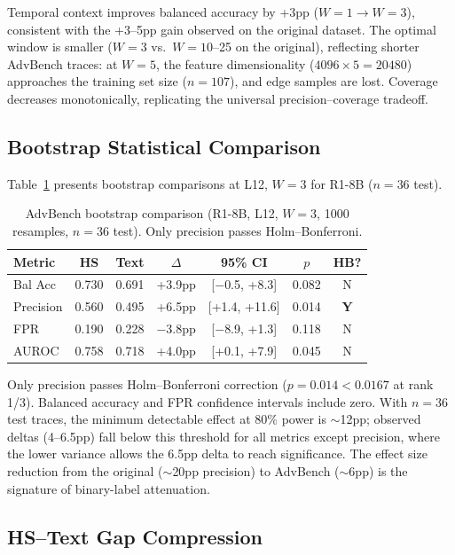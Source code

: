 \documentclass[11pt]{article}
\begin{document}
Temporal context improves balanced accuracy by +3pp ($W{=}1 \to W{=}3$), consistent with the +3--5pp gain observed on the original dataset. The optimal window is smaller ($W{=}3$ vs.\ $W{=}10$--25 on the original), reflecting shorter AdvBench traces: at $W{=}5$, the feature dimensionality ($4096 \times 5 = 20480$) approaches the training set size ($n{=}107$), and edge samples are lost. Coverage decreases monotonically, replicating the universal precision--coverage tradeoff.

\subsection{Bootstrap Statistical Comparison}
\label{sec:bootstrap}

Table~\ref{tab:bootstrap} presents bootstrap comparisons at L12, $W{=}3$ for R1-8B ($n{=}36$ test).

\begin{table}[t]
\centering
\small
\caption{AdvBench bootstrap comparison (R1-8B, L12, $W{=}3$, 1000 resamples, $n{=}36$ test). Only precision passes Holm--Bonferroni.}
\label{tab:bootstrap}
\begin{tabular}{lcccccc}
\toprule
Metric & HS & Text & $\Delta$ & 95\% CI & $p$ & HB? \\
\midrule
Bal Acc & 0.730 & 0.691 & +3.9pp & [$-$0.5, +8.3] & 0.082 & N \\
Precision & 0.560 & 0.495 & +6.5pp & [+1.4, +11.6] & 0.014 & \textbf{Y} \\
FPR & 0.190 & 0.228 & $-$3.8pp & [$-$8.9, +1.3] & 0.118 & N \\
AUROC & 0.758 & 0.718 & +4.0pp & [+0.1, +7.9] & 0.045 & N \\
\bottomrule
\end{tabular}
\end{table}

Only precision passes Holm--Bonferroni correction ($p{=}0.014 < 0.0167$ at rank 1/3). Balanced accuracy and FPR confidence intervals include zero. With $n{=}36$ test traces, the minimum detectable effect at 80\% power is $\sim$12pp; observed deltas (4--6.5pp) fall below this threshold for all metrics except precision, where the lower variance allows the 6.5pp delta to reach significance. The effect size reduction from the original ($\sim$20pp precision) to AdvBench ($\sim$6pp) is the signature of binary-label attenuation.

\subsection{HS--Text Gap Compression}
\end{document}
